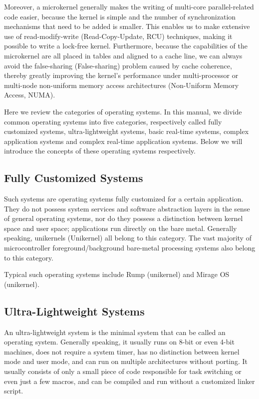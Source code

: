 Moreover, a microkernel generally makes the writing of multi-core parallel-related code easier, because the kernel is simple and the number of synchronization mechanisms that need to be added is smaller. This enables us to make extensive use of read-modify-write (Read-Copy-Update, RCU) techniques, making it possible to write a lock-free kernel. Furthermore, because the capabilities of the microkernel are all placed in tables and aligned to a cache line, we can always avoid the false-sharing (False-sharing) problem caused by cache coherence, thereby greatly improving the kernel's performance under multi-processor or multi-node non-uniform memory access architectures (Non-Uniform Memory Access, NUMA).

Here we review the categories of operating systems. In this manual, we divide common operating systems into five categories, respectively called fully customized systems, ultra-lightweight systems, basic real-time systems, complex application systems and complex real-time application systems. Below we will introduce the concepts of these operating systems respectively.

\subsection{Fully Customized Systems}\label{subsec:1-fully-customized-systems}

Such systems are operating systems fully customized for a certain application. They do not possess system services and software abstraction layers in the sense of general operating systems, nor do they possess a distinction between kernel space and user space; applications run directly on the bare metal. Generally speaking, unikernels (Unikernel) all belong to this category. The vast majority of microcontroller foreground/background bare-metal processing systems also belong to this category.

Typical such operating systems include Rump (unikernel) and Mirage OS (unikernel).

\subsection{Ultra-Lightweight Systems}\label{subsec:1-ultra-lightweight-systems}

An ultra-lightweight system is the minimal system that can be called an operating system. Generally speaking, it usually runs on 8-bit or even 4-bit machines, does not require a system timer, has no distinction between kernel mode and user mode, and can run on multiple architectures without porting. It usually consists of only a small piece of code responsible for task switching or even just a few macros, and can be compiled and run without a customized linker script.


